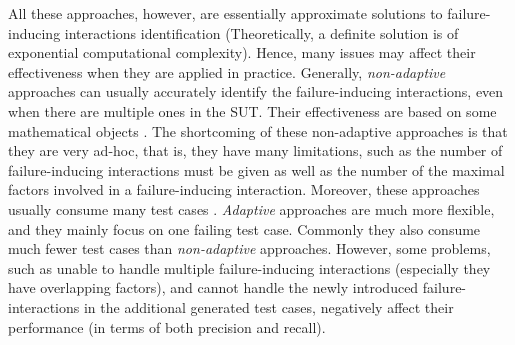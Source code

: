 All these approaches, however, are essentially approximate solutions to failure-inducing interactions identification (Theoretically, a definite solution is of exponential computational complexity). Hence, many issues may affect their effectiveness when they are applied in practice.  Generally, \emph{non-adaptive} approaches can usually accurately identify the failure-inducing interactions, even when there are multiple ones in the SUT. Their effectiveness are based on some mathematical objects \cite{colbourn2008locating,martinez2008algorithms,martinez2009locating}. The shortcoming of these non-adaptive approaches is that they are very ad-hoc, that is, they have many limitations, such as the number of failure-inducing interactions must be given as well as the number of the maximal factors involved in a failure-inducing interaction. Moreover, these approaches usually consume many test cases \cite{zhang2011characterizing}. \emph{Adaptive} approaches are much more flexible, and they mainly focus on one failing test case. Commonly they also consume much fewer test cases than \emph{non-adaptive} approaches. However, some problems, such as unable to handle multiple failure-inducing interactions (especially they have overlapping factors), and cannot handle the newly introduced failure-interactions in the additional generated test cases, negatively affect their performance (in terms of both precision and recall).


